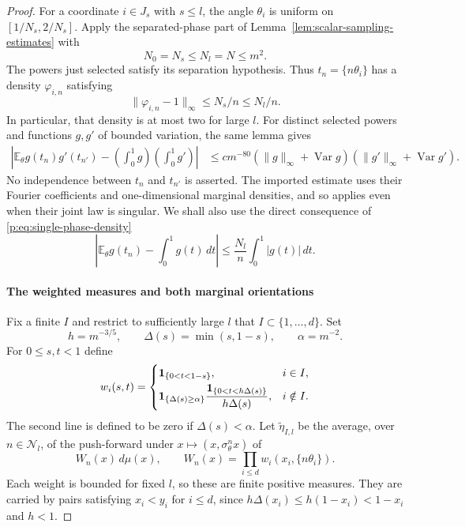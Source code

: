\begin{proof}
For a coordinate $i\in J_s$ with $s\le l$, the angle $\theta_i$ is
uniform on $[1/N_s,2/N_s]$.  Apply the separated-phase part of
Lemma~\ref{lem:scalar-sampling-estimates} with
\[
 N_0=N_s\le N_l=N\le m^2.
\]
The powers just selected satisfy its separation hypothesis.  Thus
$t_n=\{n\theta_i\}$ has a density $\varphi_{i,n}$ satisfying
\begin{equation}\label{p:eq:single-phase-density}
 \|\varphi_{i,n}-1\|_\infty\le N_s/n\le N_l/n.
\end{equation}
In particular, that density is at most two for large $l$.  For distinct
selected powers and functions $g,g'$ of bounded variation, the same
lemma gives
\begin{equation}\label{p:eq:bv-discrepancy}
 \begin{split}
 \left|\mathbb E_\theta g(t_n)g'(t_{n'})
       -\left(\int_0^1g\right)\left(\int_0^1g'\right)\right|
 &\le c m^{-80}
   (\|g\|_\infty+\operatorname{Var}g)
   (\|g'\|_\infty+\operatorname{Var}g').
 \end{split}
\end{equation}
No independence between $t_n$ and $t_{n'}$ is asserted.  The imported
estimate uses their Fourier coefficients and one-dimensional marginal
densities, and so applies even when their joint law is singular.
We shall also use the direct consequence of
\eqref{p:eq:single-phase-density}
\begin{equation}\label{p:eq:single-phase-test}
 \left|\mathbb E_\theta g(t_n)-\int_0^1g(t)\,dt\right|
 \le\frac{N_l}{n}\int_0^1|g(t)|\,dt.
\end{equation}

\paragraph{The weighted measures and both marginal orientations}

Fix a finite $I$ and restrict to sufficiently large $l$ that
$I\subset\{1,\ldots,d\}$.  Set
\[
 h=m^{-3/5},\qquad \Delta(s)=\min(s,1-s),\qquad \alpha=m^{-2}.
\]
For $0\le s,t<1$ define
\begin{equation}\label{p:eq:sampling-weights}
 w_i(s,t)=
 \begin{cases}
 \mathbf 1_{\{0<t<1-s\}},&i\in I,\\[1mm]
 \displaystyle\mathbf 1_{\{\Delta(s)\ge\alpha\}}
 \frac{\mathbf 1_{\{0<t<h\Delta(s)\}}}{h\Delta(s)},&i\notin I.
 \end{cases}
\end{equation}
The second line is defined to be zero if $\Delta(s)<\alpha$.
Let $\widetilde\eta_{I,l}$ be the average, over $n\in\mathcal N_l$,
of the push-forward under $x\mapsto(x,\sigma_\theta^n x)$ of
\begin{equation}\label{p:eq:untrimmed-weight}
 W_n(x)\,d\mu(x),\qquad
 W_n(x)=\prod_{i\le d}w_i(x_i,\{n\theta_i\}).
\end{equation}
Each weight is bounded for fixed $l$, so these are finite positive
measures.  They are carried by pairs satisfying $x_i<y_i$ for $i\le d$, since
$h\Delta(x_i)\le h(1-x_i)<1-x_i$ and $h<1$.


\end{proof}
